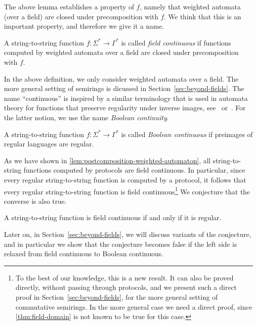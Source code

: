 The above lemma establishes a property of $f$, namely that weighted automata (over a field) are closed under precomposition with $f$. We think that this is an important property, and therefore we give it a name.


\begin{definition}
    \label{def:weighted-continuity}
    A string-to-string function $f : \Sigma^* \to \Gamma^*$ is called \emph{field continuous} if functions computed by weighted automata over a field are closed under precomposition with $f$.
\end{definition}

In the above definition, we only consider weighted automata over a field. The more general setting of semirings is dicussed in Section~\ref{sec:beyond-fields}.
The name ``continuous'' is inspired by a similar terminology that is used in automata theory for functions that preserve regularity under inverse images, see~\cite[Theorem 4.1]{PinSilva05} or~\cite[Footnote 2]{continuity20}.  For the latter notion, we use the name \emph{Boolean continuity}.

\begin{definition}
    A string-to-string function $f : \Sigma^* \to \Gamma^*$ is called \emph{Boolean continuous} if preimages of regular languages are regular.
\end{definition}

As we have shown in \cref{lem:postcomposition-weighted-automaton}, all string-to-string functions computed by protocols are field continuous. In particular, since every regular string-to-string function is computed by a protocol, it follows that every regular string-to-string function is field continuous\footnote{To the best of our knowledge, this is a new result. It can also be proved directly, without passing through protocols, and we present such a direct proof in Section~\ref{sec:beyond-fields}, for the more general setting of commutative semirings. In the more general case we need a direct proof, since \cref{thm:field-domain} is not known to be true for this case.}
We conjecture that the converse is also true.

\begin{conjecture}\label{conj:regular-continuous}
    A string-to-string function is field continuous if and only if it is regular.
\end{conjecture}

Later on, in Section~\ref{sec:beyond-fields}, we will discuss variants of the conjecture, and in particular we show that the conjecture becomes false if the left side is relaxed from field continuous to Boolean continuous.

